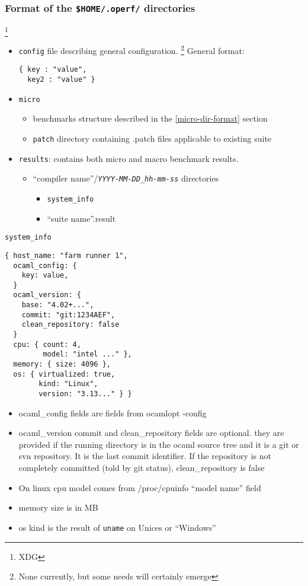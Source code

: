 \documentclass[11pt,a4paper]{article}
\begin{document}
\subsubsection{Format of the {\tt \$HOME/.operf/} directories}
\footnote{XDG}
\begin{itemize}
\item {\tt config} file describing general configuration.
  \footnote{None currently, but some needs will certainly emerge}
  General format:
\begin{verbatim}
{ key : "value",
  key2 : "value" }
\end{verbatim}
\item {\tt micro}
  \begin{itemize}
  \item benchmarks structure described in the \ref{micro-dir-format} section
  \item {\tt patch} directory containing .patch files applicable to existing suite
  \end{itemize}
\item {\tt results}: contains both micro and macro benchmark results.
  \begin{itemize}
  \item ``compiler name''/{\tt\em YYYY-MM-DD\_hh-mm-ss} directories
    \begin{itemize}
    \item {\tt system\_info}
    \item ``suite name''.result
    \end{itemize}
  \end{itemize}
\end{itemize}

{\tt system\_info}
\begin{verbatim}
{ host_name: "farm runner 1",
  ocaml_config: {
    key: value,
  }
  ocaml_version: {
    base: "4.02+...",
    commit: "git:1234AEF",
    clean_repository: false
  }
  cpu: { count: 4,
         model: "intel ..." },
  memory: { size: 4096 },
  os: { virtualized: true,
        kind: "Linux",
        version: "3.13..." } }
\end{verbatim}

\begin{itemize}
\item ocaml\_config fields are fields from ocamlopt -config
\item ocaml\_version commit and clean\_repository fields are
  optional.  they are provided if the running directory is in the
  ocaml source tree and it is a git or svn repository. It is the last
  commit identifier. If the repository is not completely committed
  (told by git status), clean\_repository is false
\item On linux cpu model comes from /proc/cpuinfo ``model name'' field
\item memory size is in MB
\item os kind is the result of {\tt uname} on Unices or ``Windows''
\end{itemize}
\end{document}
